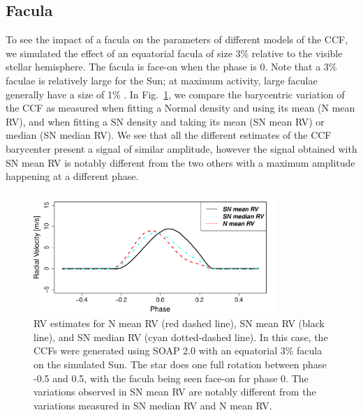 \documentclass{aa}
\newcommand{\jessi}[1]{{\color{Purple}[[\textbf{Jessi: }#1]]}}
\begin{document}
\subsection{Facula} \label{sec:soap.faculae}

To see the impact of a facula on the parameters of different models of the CCF, we simulated the effect of an equatorial facula
of size 3\% relative to the visible stellar hemisphere. The facula is face-on when the phase is 0. 
Note that a 3\% faculae is relatively large for the Sun; at maximum activity, large faculae generally have a size of 1\% \citep[e.g.][]{Borgniet-2015}. 
In Fig.~\ref{fig:faculae}, we compare the barycentric variation of the CCF as measured when fitting a Normal density and using its mean (N mean RV), and when fitting a SN density and taking its mean (SN mean RV) or median (SN median RV). We see that all the different estimates of the CCF barycenter present a signal of similar amplitude, however the signal obtained with SN mean RV is notably different from the two others with a maximum amplitude happening at a different phase.

\begin{figure}[htbp]
\begin{center}
\includegraphics[width=3.6in]{RV_comparison_FACULAE.pdf} 
\caption{RV estimates for N mean RV (red dashed line),  SN mean RV (black line), and SN median RV (cyan dotted-dashed line). In this case, the CCFs were generated using SOAP 2.0 with an equatorial 3\% facula on the simulated Sun. The star does one full rotation between phase -0.5 and 0.5, with the facula being seen face-on for phase $0$. The variations observed in SN mean RV are notably different from the variations measured in SN median RV and N mean RV.  
}
    \label{fig:faculae}
\end{center}
\end{figure}
\end{document}
